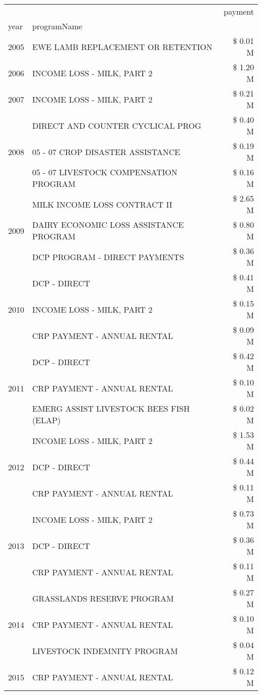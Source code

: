 \begin{tabular}{llr}
\toprule
 &  & payment \\
year & programName &  \\
\midrule
2005 & EWE LAMB REPLACEMENT OR RETENTION & \$ 0.01 M \\
\cline{1-3}
2006 & INCOME LOSS - MILK, PART 2 & \$ 1.20 M \\
\cline{1-3}
2007 & INCOME LOSS - MILK, PART 2 & \$ 0.21 M \\
\cline{1-3}
\multirow[t]{3}{*}{2008} & DIRECT AND COUNTER CYCLICAL PROG & \$ 0.40 M \\
 & 05 - 07 CROP DISASTER ASSISTANCE & \$ 0.19 M \\
 & 05 - 07 LIVESTOCK COMPENSATION PROGRAM & \$ 0.16 M \\
\cline{1-3}
\multirow[t]{3}{*}{2009} & MILK INCOME LOSS CONTRACT II & \$ 2.65 M \\
 & DAIRY ECONOMIC LOSS ASSISTANCE PROGRAM & \$ 0.80 M \\
 & DCP PROGRAM - DIRECT PAYMENTS & \$ 0.36 M \\
\cline{1-3}
\multirow[t]{3}{*}{2010} & DCP - DIRECT & \$ 0.41 M \\
 & INCOME LOSS - MILK, PART 2 & \$ 0.15 M \\
 & CRP PAYMENT - ANNUAL RENTAL & \$ 0.09 M \\
\cline{1-3}
\multirow[t]{3}{*}{2011} & DCP - DIRECT & \$ 0.42 M \\
 & CRP PAYMENT - ANNUAL RENTAL & \$ 0.10 M \\
 & EMERG ASSIST LIVESTOCK BEES FISH (ELAP) & \$ 0.02 M \\
\cline{1-3}
\multirow[t]{3}{*}{2012} & INCOME LOSS - MILK, PART 2 & \$ 1.53 M \\
 & DCP - DIRECT & \$ 0.44 M \\
 & CRP PAYMENT - ANNUAL RENTAL & \$ 0.11 M \\
\cline{1-3}
\multirow[t]{3}{*}{2013} & INCOME LOSS - MILK, PART 2 & \$ 0.73 M \\
 & DCP - DIRECT & \$ 0.36 M \\
 & CRP PAYMENT - ANNUAL RENTAL & \$ 0.11 M \\
\cline{1-3}
\multirow[t]{3}{*}{2014} & GRASSLANDS RESERVE PROGRAM & \$ 0.27 M \\
 & CRP PAYMENT - ANNUAL RENTAL & \$ 0.10 M \\
 & LIVESTOCK INDEMNITY PROGRAM & \$ 0.04 M \\
\cline{1-3}
\multirow[t]{3}{*}{2015} & CRP PAYMENT - ANNUAL RENTAL & \$ 0.12 M \\

\end{tabular}
